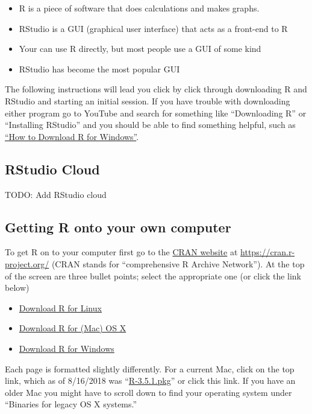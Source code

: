 \documentclass[
]{book}
\providecommand{\tightlist}{%
  \setlength{\itemsep}{0pt}\setlength{\parskip}{0pt}}
\begin{document}
\begin{itemize}
\tightlist
\item
  R is a piece of software that does calculations and makes graphs.
\item
  RStudio is a GUI (graphical user interface) that acts as a front-end to R
\item
  Your can use R directly, but most people use a GUI of some kind
\item
  RStudio has become the most popular GUI
\end{itemize}

The following instructions will lead you click by click through downloading R and RStudio and starting an initial session. If you have trouble with downloading either program go to YouTube and search for something like ``Downloading R'' or ``Installing RStudio'' and you should be able to find something helpful, such as \href{https://www.youtube.com/watch?v=GYdmkLgV9n8}{``How to Download R for Windows''}.

\hypertarget{rstudio-cloud}{%
\subsection{RStudio Cloud}\label{rstudio-cloud}}

TODO: Add RStudio cloud

\hypertarget{getting-r-onto-your-own-computer}{%
\subsection{Getting R onto your own computer}\label{getting-r-onto-your-own-computer}}

To get R on to your computer first go to the \href{https://cran.r-project.org/}{CRAN website} at \url{https://cran.r-project.org/} (CRAN stands for ``comprehensive R Archive Network''). At the top of the screen are three bullet points; select the appropriate one (or click the link below)

\begin{itemize}
\tightlist
\item
  \href{https://cran.r-project.org/bin/linux/}{Download R for Linux}
\item
  \href{https://cran.r-project.org/bin/macosx/}{Download R for (Mac) OS X}
\item
  \href{https://cran.r-project.org/bin/windows/}{Download R for Windows}
\end{itemize}

Each page is formatted slightly differently. For a current Mac, click on the top link, which as of 8/16/2018 was ``\href{https://cran.r-project.org/bin/macosx/R-3.5.1.pkg}{R-3.5.1.pkg}'' or click this link. If you have an older Mac you might have to scroll down to find your operating system under ``Binaries for legacy OS X systems.''
\end{document}
